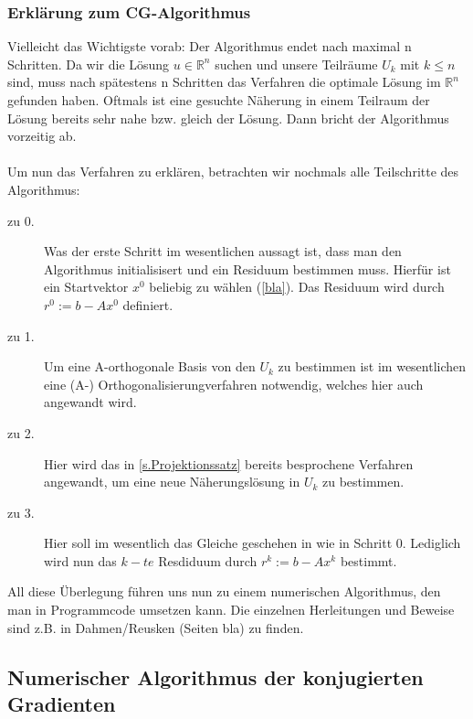 \subsubsection{Erklärung zum CG-Algorithmus}\label{Erklärung zum CG-Algorithmus}

Vielleicht das Wichtigste vorab: Der Algorithmus endet nach maximal n Schritten. Da wir die Lösung $u \in \mathbb{R}^{n}$ suchen und unsere Teilräume $U_{k}$ mit $k \le n$ sind, muss nach spätestens n Schritten das Verfahren die optimale Lösung im $\mathbb{R}^{n}$  gefunden haben. Oftmals ist eine gesuchte Näherung in einem Teilraum der Lösung bereits sehr nahe bzw. gleich der Lösung. Dann bricht der Algorithmus vorzeitig ab. \\ \\
Um nun das Verfahren zu erklären, betrachten wir nochmals alle Teilschritte des Algorithmus:
\begin{description}

\item[zu 0.] Was der erste Schritt im wesentlichen aussagt ist, dass man den Algorithmus initialisisert und ein Residuum bestimmen muss. Hierfür ist ein Startvektor $x^{0}$ beliebig zu wählen (\autoref{bla}). Das Residuum wird durch $r^{0} := b - Ax^{0}$ definiert.

\item[zu 1.] Um eine A-orthogonale Basis von den $U_{k}$ zu bestimmen ist im wesentlichen eine (A-) Orthogonalisierungverfahren notwendig, welches hier auch angewandt wird.

\item[zu 2.] Hier wird das in \autoref{s.Projektionssatz} bereits besprochene Verfahren angewandt, um eine neue Näherungslösung in $U_{k}$ zu bestimmen.

\item[zu 3.] Hier soll im wesentlich das Gleiche geschehen in wie in Schritt 0. Lediglich wird nun das $k-te$ Resdiduum durch $r^{k} := b - Ax^{k}$ bestimmt.

\end{description}

All diese Überlegung führen uns nun zu einem numerischen Algorithmus, den man in Programmcode umsetzen kann. Die einzelnen Herleitungen und Beweise sind z.B. in Dahmen/Reusken (Seiten bla) zu finden.

\subsection{Numerischer Algorithmus der konjugierten Gradienten}

